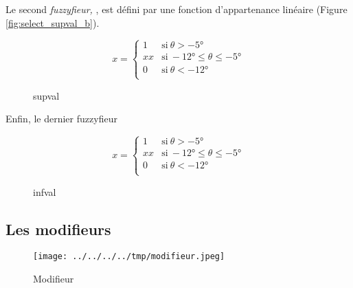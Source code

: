 Le second \emph{fuzzyfieur,} , est défini par une fonction d'appartenance linéaire (Figure \ref{fig:select_supval_b}).

\begin{equation}
  \label{eq:sup_val}
  x = \left\{
    \begin{array}{ll}
      1 & \text{si}\ θ > -5° \\
      xx & \text{si}\ -12° ≤ θ ≤ -5° \\
      0 & \text{si}\ θ < -12°\\
    \end{array}
  \right.
\end{equation}

\begin{figure}
  \centering
  \subfloat[supval]{
    
    \label{fig:select_supval_b}
  }\hfill
  \subfloat[supval0]{
    
    \label{fig:select_supval_0}
  }
  \caption{supval}
  \label{fig:select_supval}
\end{figure}

Enfin, le dernier fuzzyfieur

\begin{equation}
  \label{eq:inf_val}
  x = \left\{
    \begin{array}{ll}
      1 & \text{si}\ θ > -5° \\
      xx & \text{si}\ -12° ≤ θ ≤ -5° \\
      0 & \text{si}\ θ < -12°\\
    \end{array}
  \right.
\end{equation}

\begin{figure}
  \centering
  \subfloat[infval]{
    
  }\hfill
  \subfloat[infval0]{
    
  }

  \caption{infval}
  \label{fig:select_infval}
\end{figure}

\subsection{Les modifieurs}



\begin{figure}
  \centering
  \texttt{[image: ../../../../tmp/modifieur.jpeg]}
  \caption{Modifieur}
  \label{fig:methode_modifieur}
\end{figure}



